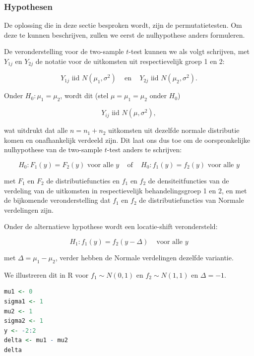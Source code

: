 \documentclass[
  12pt,dutch,coursenotes]{book}
\begin{document}
\hypertarget{hypothesen}{%
\subsubsection{Hypothesen}\label{hypothesen}}

De oplossing die in deze sectie besproken wordt, zijn de permutatietesten.
Om deze te kunnen beschrijven, zullen we eerst de nulhypothese anders formuleren.

De veronderstelling voor de two-sample \(t\)-test kunnen we als volgt schrijven, met \(Y_{1j}\) en \(Y_{2j}\) de notatie voor de uitkomsten uit respectievelijk groep 1 en 2:

\[Y_{1j} \text{ iid } N(\mu_1,\sigma^2) \;\;\;\text{ en }\;\;\; Y_{2j} \text{ iid } N(\mu_2,\sigma^2).\]

Onder \(H_0:\mu_1=\mu_2\), wordt dit (stel \(\mu=\mu_1=\mu_2\) onder \(H_0\))

\[ Y_{ij} \text{ iid } N(\mu,\sigma^2),\]

wat uitdrukt dat alle \(n=n_1+n_2\) uitkomsten uit dezelfde normale distributie komen en onafhankelijk verdeeld zijn. Dit laat ons dus toe om de oorspronkelijke nulhypothese van de two-sample \(t\)-test anders te schrijven:

\begin{equation}
H_0: F_1(y) = F_2(y) \text{ voor alle } y \;\;\;\text{ of }\;\;\; H_0: f_1(y) = f_2(y) \text{ voor alle } y \label{eq:H0F1F2}
\end{equation}

met \(F_1\) en \(F_2\) de distributiefuncties en \(f_1\) en \(f_2\) de densiteitfuncties van de verdeling van de uitkomsten in respectievelijk behandelingsgroep 1 en 2, en met de bijkomende veronderstelling dat \(f_1\) en \(f_2\) de distributiefuncties van Normale verdelingen zijn.

Onder de alternatieve hypothese wordt een locatie-shift verondersteld:

\[H_1: f_1(y)=f_2(y-\Delta) \;\;\;\text{ voor alle } y\]

met \(\Delta=\mu_1-\mu_2\), verder hebben de Normale verdelingen dezelfde variantie.

We illustreren dit in R voor \(f_1\sim N(0,1)\) en \(f_2\sim N(1,1)\) en \(\Delta=-1\).

\begin{lstlisting}[language=R]
mu1 <- 0
sigma1 <- 1
mu2 <- 1
sigma2 <- 1
y <- -2:2
delta <- mu1 - mu2
delta
\end{lstlisting}
\end{document}
